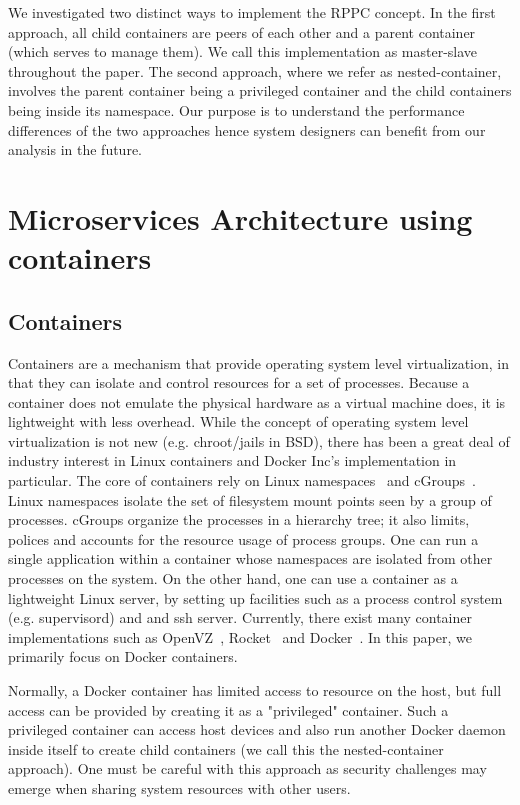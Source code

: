\documentclass[conference]{IEEEtran}
\begin{document}
We investigated two distinct ways to implement the RPPC concept. In the first approach, all child containers are peers of each other and a parent container (which serves to manage them). We call this implementation as master-slave throughout the paper. The second approach, where we refer as nested-container, involves the parent container being a privileged container and the child containers being inside its namespace. Our purpose is to understand the performance differences of the two approaches hence system designers can benefit from our analysis in the future.

\section{Microservices Architecture using containers}
\label{sec:microservices}
\subsection{Containers}
Containers are a mechanism that provide operating system level virtualization,
in that they can isolate and control resources for a set of processes.
Because a container does not emulate the physical hardware as a virtual 
machine does, it is lightweight with less overhead. While the concept of 
operating system level virtualization is not new (e.g. chroot/jails in BSD), 
there has been a great deal of industry interest in Linux containers and Docker 
Inc's implementation in particular.
The core of containers rely on Linux
namespaces~\cite{namespace} and cGroups~\cite{cgroups}.
Linux namespaces isolate the set of filesystem mount points seen by
a group of processes. cGroups organize the processes in a hierarchy tree; it
also limits, polices and accounts for the resource usage of process groups. One can
run a single application within a container whose namespaces are isolated
from other processes on the system.
On the other hand, one can use a container as a lightweight Linux server, by 
setting up facilities such as a process control system (e.g. supervisord) and 
and ssh server. Currently, there exist many container implementations such as
OpenVZ~\cite{OpenVZ}, Rocket~\cite{rocket} and Docker~\cite{Docker}. In this 
paper, we primarily focus on Docker containers.

Normally, a Docker container has limited access to resource on the host, but 
full access can be provided by creating it as a "privileged" container. Such a 
privileged container can access host devices and also run another Docker daemon 
inside itself to create child containers (we call this the nested-container 
approach). One must be careful with this approach as security challenges may 
emerge when sharing system resources with other users.
\end{document}
